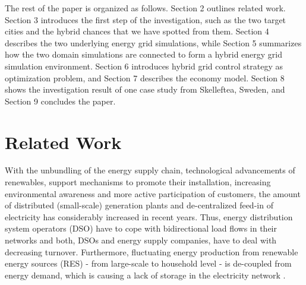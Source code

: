\documentclass[review]{elsarticle}
\begin{document}

The rest of the paper is organized as follows. Section 2 outlines
related work. Section 3 introduces the first step of the
investigation, such as the two target cities and the hybrid chances
that we have spotted from them. Section 4 describes the two
underlying energy grid simulations, while Section 5 summarizes how the
two domain simulations are connected to form a hybrid energy grid
simulation environment. Section 6 introduces hybrid grid control
strategy as optimization problem, and Section 7 describes the economy
model. Section 8 shows the investigation result of one case
study from Skelleftea, Sweden, and Section 9 concludes the paper. 


\section{Related Work}
\label{sec:related_work}
With the unbundling of the energy supply chain, technological
advancements of renewables, support mechanisms to promote their
installation, increasing environmental awareness and more active
participation of customers, the amount of distributed (small-scale)
generation plants and de-centralized feed-in of electricity has
considerably increased in recent years. Thus, energy distribution
system operators (DSO) have to cope with bidirectional load flows in
their networks and both, DSOs and energy supply companies, have to
deal with decreasing turnover. Furthermore, fluctuating energy
production from renewable energy sources (RES) - from large-scale to
household level - is de-coupled from  energy demand, which is 
causing a lack of storage in the electricity network
\cite{trebolle_2010}. 
\end{document}
